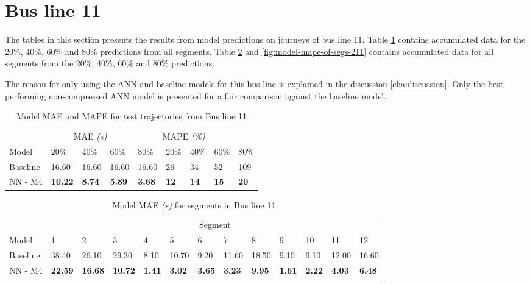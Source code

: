 \section{Bus line 11}
The tables in this section presents the results from model predictions on journeys of bus line 11. Table \ref{tbl:models-mae-and-mape-211} contains accumulated data for the 20\%, 40\%, 60\% and 80\% predictions from all segments. Table \ref{tbl:model-mae-of-segs-211} and \ref{fig:model-mape-of-segs-211} contains accumulated data for all segments from the 20\%, 40\%, 60\% and 80\% predictions.

The reason for only using the ANN and baseline models for this bus line is explained in the discussion \ref{cha:discussion}. Only the best performing non-compressed ANN model is presented for a fair comparison against the baseline model.
\begin{table}[H]
	\centering
	\caption{Model MAE and MAPE for test trajectories from Bus line 11}
	\label{tbl:models-mae-and-mape-211}
	\begin{tabular}{l | l | l | l | l || l | l | l | l }
		& \multicolumn{3}{c}{MAE \textit{(s)}} & \multicolumn{4}{c}{MAPE \textit{(\%)}} \\
		Model      & 20\% & 40\% & 60\% & 80\% & 20\% & 40\% & 60\% & 80\% \\
		\hline
		Baseline & 16.60 & 16.60 & 16.60 & 16.60  & 26 & 34 & 52 & 109 \\
		NN - M4        & \textbf{10.22}& \textbf{8.74}& \textbf{5.89}& \textbf{3.68}& \textbf{12}& \textbf{14}& \textbf{15}& \textbf{20} \\
	\end{tabular}
\end{table}

\begin{table}[H]
	\centering
	\caption{Model MAE \textit{(s)} for segments in Bus line 11}
	\label{tbl:model-mae-of-segs-211}
	\begin{adjustbox}{center}
	\begin{tabular}{ l | l | l | l | l | l | l | l | l | l | l | l | l}
		& \multicolumn{12}{c}{Segment} \\
		Model       & 1 & 2 & 3 & 4 & 5 & 6 & 7 & 8 & 9 & 10 & 11 & 12 \\
		\hline
		Baseline  & 38.40 & 26.10 & 29.30 & 8.10 & 10.70 & 9.20 & 11.60 & 18.50 & 9.10 & 9.10  & 12.00 & 16.60 \\
		NN - M4         & \textbf{22.59}& \textbf{16.68}& \textbf{10.72}& \textbf{1.41}& \textbf{3.02}& \textbf{3.65}& \textbf{3.23}& \textbf{9.95}& \textbf{1.61}& \textbf{2.22}& \textbf{4.03}& \textbf{6.48}\\
	\end{tabular}
	\end{adjustbox}
\end{table}

